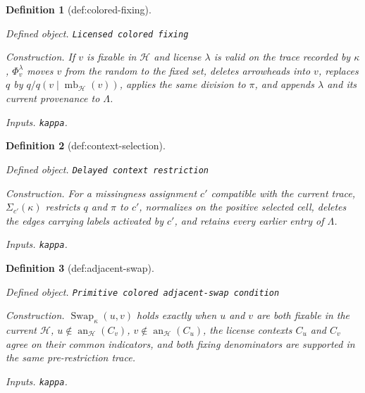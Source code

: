 \documentclass{article}
\newtheorem{definition}{Definition}
\begin{document}
\begin{definition}[def:colored-fixing]\label{def:colored-fixing}
\par\smallskip\noindent\emph{Defined object.} \texttt{Licensed colored fixing}
\par\smallskip\noindent\emph{Construction.} If \(v\) is fixable in \(\mathcal H\) and license \(\lambda\) is valid on the trace recorded by \(\kappa\), \(\Phi_v^{\lambda}\) moves \(v\) from the random to the fixed set, deletes arrowheads into \(v\), replaces \(q\) by \(q/q(v\mid\operatorname{mb}_{\mathcal H}(v))\), applies the same division to \(\pi\), and appends \(\lambda\) and its current provenance to \(\Lambda\).
\par\smallskip\noindent\emph{Inputs.} \texttt{kappa}.
\end{definition}

\begin{definition}[def:context-selection]\label{def:context-selection}
\par\smallskip\noindent\emph{Defined object.} \texttt{Delayed context restriction}
\par\smallskip\noindent\emph{Construction.} For a missingness assignment \(c'\) compatible with the current trace, \(\Sigma_{c'}(\kappa)\) restricts \(q\) and \(\pi\) to \(c'\), normalizes on the positive selected cell, deletes the edges carrying labels activated by \(c'\), and retains every earlier entry of \(\Lambda\).
\par\smallskip\noindent\emph{Inputs.} \texttt{kappa}.
\end{definition}

\begin{definition}[def:adjacent-swap]\label{def:adjacent-swap}
\par\smallskip\noindent\emph{Defined object.} \texttt{Primitive colored adjacent-\allowbreak{}swap condition}
\par\smallskip\noindent\emph{Construction.} \(\operatorname{Swap}_{\kappa}(u,v)\) holds exactly when \(u\) and \(v\) are both fixable in the current \(\mathcal H\), \(u\notin\operatorname{an}_{\mathcal H}(C_v)\), \(v\notin\operatorname{an}_{\mathcal H}(C_u)\), the license contexts \(C_u\) and \(C_v\) agree on their common indicators, and both fixing denominators are supported in the same pre-restriction trace.
\par\smallskip\noindent\emph{Inputs.} \texttt{kappa}.
\end{definition}
\end{document}
